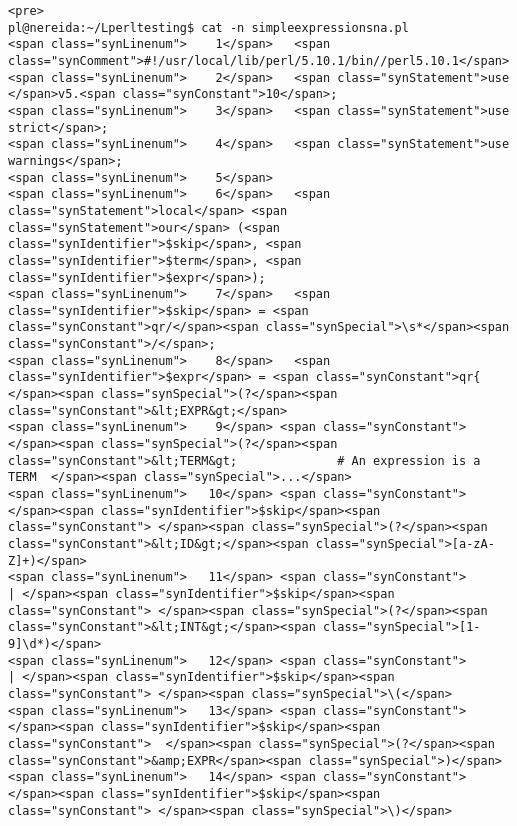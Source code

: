 \begin{verbatim}
<pre>
pl@nereida:~/Lperltesting$ cat -n simpleexpressionsna.pl
<span class="synLinenum">    1</span>   <span class="synComment">#!/usr/local/lib/perl/5.10.1/bin//perl5.10.1</span>
<span class="synLinenum">    2</span>   <span class="synStatement">use </span>v5.<span class="synConstant">10</span>;
<span class="synLinenum">    3</span>   <span class="synStatement">use strict</span>;
<span class="synLinenum">    4</span>   <span class="synStatement">use warnings</span>;
<span class="synLinenum">    5</span> 
<span class="synLinenum">    6</span>   <span class="synStatement">local</span> <span class="synStatement">our</span> (<span class="synIdentifier">$skip</span>, <span class="synIdentifier">$term</span>, <span class="synIdentifier">$expr</span>);
<span class="synLinenum">    7</span>   <span class="synIdentifier">$skip</span> = <span class="synConstant">qr/</span><span class="synSpecial">\s*</span><span class="synConstant">/</span>;
<span class="synLinenum">    8</span>   <span class="synIdentifier">$expr</span> = <span class="synConstant">qr{ </span><span class="synSpecial">(?</span><span class="synConstant">&lt;EXPR&gt;</span>
<span class="synLinenum">    9</span> <span class="synConstant">                     </span><span class="synSpecial">(?</span><span class="synConstant">&lt;TERM&gt;              # An expression is a TERM  </span><span class="synSpecial">...</span>
<span class="synLinenum">   10</span> <span class="synConstant">                            </span><span class="synIdentifier">$skip</span><span class="synConstant"> </span><span class="synSpecial">(?</span><span class="synConstant">&lt;ID&gt;</span><span class="synSpecial">[a-zA-Z]+)</span>
<span class="synLinenum">   11</span> <span class="synConstant">                          | </span><span class="synIdentifier">$skip</span><span class="synConstant"> </span><span class="synSpecial">(?</span><span class="synConstant">&lt;INT&gt;</span><span class="synSpecial">[1-9]\d*)</span>
<span class="synLinenum">   12</span> <span class="synConstant">                          | </span><span class="synIdentifier">$skip</span><span class="synConstant"> </span><span class="synSpecial">\(</span>
<span class="synLinenum">   13</span> <span class="synConstant">                            </span><span class="synIdentifier">$skip</span><span class="synConstant">  </span><span class="synSpecial">(?</span><span class="synConstant">&amp;EXPR</span><span class="synSpecial">)</span>
<span class="synLinenum">   14</span> <span class="synConstant">                            </span><span class="synIdentifier">$skip</span><span class="synConstant"> </span><span class="synSpecial">\)</span>

\end{verbatim}
